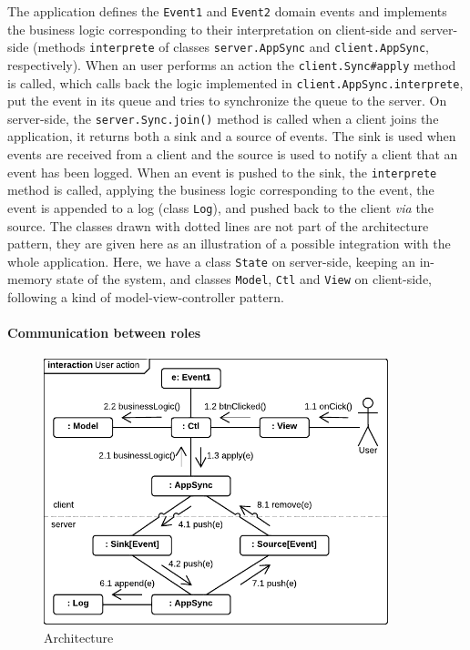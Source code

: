 \documentclass{llncs}
\begin{document}
The application defines the {\tt Event1} and {\tt Event2} domain events and implements the business logic corresponding to their interpretation on client-side and server-side (methods {\tt interprete} of classes {\tt server.AppSync} and {\tt client.AppSync}, respectively). When an user performs an action the {\tt client.Sync\#apply} method is called, which calls back the logic implemented in {\tt client.AppSync.interprete}, put the event in its queue and tries to synchronize the queue to the server. On server-side, the {\tt server.Sync.join()} method is called when a client joins the application, it returns both a sink and a source of events. The sink is used when events are received from a client and the source is used to notify a client that an event has been logged. When an event is pushed to the sink, the {\tt interprete} method is called, applying the business logic corresponding to the event, the event is appended to a log (class {\tt Log}), and pushed back to the client \emph{via} the source. The 
classes drawn with dotted lines are not part of the architecture pattern, they are given here as an illustration of a possible integration with the whole application. Here, we have a class {\tt State} on server-side, keeping an in-memory state of the system, and classes {\tt Model}, {\tt Ctl} and {\tt View} on client-side, following a kind of model-view-controller pattern.

\paragraph{Communication between roles}

\begin{figure}
\centering
\includegraphics[width=10cm]{communication.pdf}
\caption{Architecture}
\label{fig-communication}
\end{figure}
\end{document}
